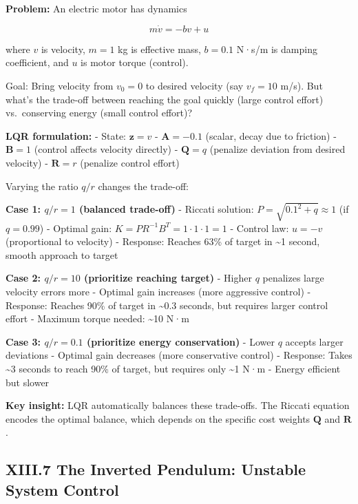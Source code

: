 \documentclass[
]{article}
\begin{document}
\textbf{Problem:} An electric motor has dynamics

\[m\dot{v} = -bv + u\]

where \(v\) is velocity, \(m = 1\) kg is effective mass, \(b = 0.1\)
N·s/m is damping coefficient, and \(u\) is motor torque (control).

Goal: Bring velocity from \(v_0 = 0\) to desired velocity (say
\(v_f = 10\) m/s). But what's the trade-off between reaching the goal
quickly (large control effort) vs.~conserving energy (small control
effort)?

\textbf{LQR formulation:} - State: \(\mathbf{z} = v\) -
\(\mathbf{A} = -0.1\) (scalar, decay due to friction) -
\(\mathbf{B} = 1\) (control affects velocity directly) -
\(\mathbf{Q} = q\) (penalize deviation from desired velocity) -
\(\mathbf{R} = r\) (penalize control effort)

Varying the ratio \(q/r\) changes the trade-off:

\textbf{Case 1: \(q/r = 1\) (balanced trade-off)} - Riccati solution:
\(P = \sqrt{0.1^2 + q} \approx 1\) (if \(q = 0.99\)) - Optimal gain:
\(K = PR^{-1}B^T = 1 \cdot 1 \cdot 1 = 1\) - Control law: \(u = -v\)
(proportional to velocity) - Response: Reaches 63\% of target in
\textasciitilde1 second, smooth approach to target

\textbf{Case 2: \(q/r = 10\) (prioritize reaching target)} - Higher
\(q\) penalizes large velocity errors more - Optimal gain increases
(more aggressive control) - Response: Reaches 90\% of target in
\textasciitilde0.3 seconds, but requires larger control effort - Maximum
torque needed: \textasciitilde10 N·m

\textbf{Case 3: \(q/r = 0.1\) (prioritize energy conservation)} - Lower
\(q\) accepts larger deviations - Optimal gain decreases (more
conservative control) - Response: Takes \textasciitilde3 seconds to
reach 90\% of target, but requires only \textasciitilde1 N·m - Energy
efficient but slower

\textbf{Key insight:} LQR automatically balances these trade-offs. The
Riccati equation encodes the optimal balance, which depends on the
specific cost weights \(\mathbf{Q}\) and \(\mathbf{R}\).

\subsection{XIII.7 The Inverted Pendulum: Unstable System
Control}\label{xiii.7-the-inverted-pendulum-unstable-system-control}
\end{document}
